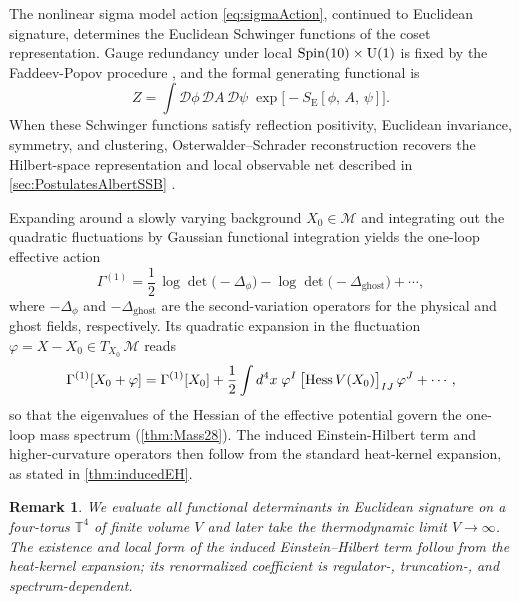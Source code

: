 \documentclass[pdflatex,sn-mathphys-num]{sn-jnl}
\theoremstyle{thmstyleone}
\theoremstyle{thmstylethree}%
\theoremstyle{thmstyletwo}%
\newtheorem{remark}[remark]{Remark}
\begin{document}
The nonlinear sigma model action \eqref{eq:sigmaAction}, continued to Euclidean
signature, determines the Euclidean Schwinger functions of the coset
representation. Gauge redundancy under local \(\operatorname{Spin}(10) \times \mathrm{U(1)}\) is fixed by the
Faddeev-Popov procedure \cite{FP67}, and the formal generating functional is
\begin{equation}\label{eq:pathIntegral}
  Z =
  \int \mathcal D\phi\,\mathcal D A\,\mathcal D\psi\;
    \exp\bigl[-S_{\mathrm E}[\phi,\,A,\,\psi]\bigr].
\end{equation}
When these Schwinger functions satisfy reflection positivity, Euclidean
invariance, symmetry, and clustering, Osterwalder--Schrader reconstruction
recovers the Hilbert-space representation and local observable net described
in \autoref{sec:PostulatesAlbertSSB}
\cite{GlimmJaffe:1987,Haag1996}.

Expanding around a slowly varying background \(X_{0}\in\mathcal M\) and
integrating out the quadratic fluctuations by Gaussian functional
integration yields the one-loop effective action \cite{Peskin:1995ev}
\begin{equation}\label{eq:effAction}
  \Gamma^{(1)}
  = \frac12\,\log\det\bigl(-\Delta_{\phi}\bigr)
    - \log\det\bigl(-\Delta_{\mathrm{ghost}}\bigr)
    + \cdots,
\end{equation}
where \(-\Delta_{\phi}\) and \(-\Delta_{\mathrm{ghost}}\) are the
second-variation operators for the physical and ghost fields,
respectively. Its quadratic expansion in the fluctuation \(\varphi=X-X_{0}\in T_{X_{0}}\,\mathcal M\) reads
\begin{equation}
\label{eq:OneLoopQuadratic}
  \Gamma^{(1)}[X_{0}+\varphi]
  = \Gamma^{(1)}[X_{0}]
    + \frac12\int d^{4}x\;\varphi^{I}\,
      \bigl[\operatorname{Hess} V(X_{0})\bigr]_{IJ}\,
      \varphi^{J}
    + \cdots,
\end{equation}
so that the eigenvalues of the Hessian of the effective potential
govern the one-loop mass spectrum (\autoref{thm:Mass28}). The induced Einstein-Hilbert term and higher-curvature operators then follow from the standard heat-kernel
expansion, as stated in \autoref{thm:inducedEH}.


\begin{remark}
We evaluate all functional determinants in Euclidean signature on a
four-torus $\mathbb T^{4}$ of finite volume $V$ and later take the
thermodynamic limit $V\to\infty$. The existence and local form of the induced
Einstein--Hilbert term follow from the heat-kernel expansion; its renormalized
coefficient is regulator-, truncation-, and spectrum-dependent.
\end{remark}
\end{document}
